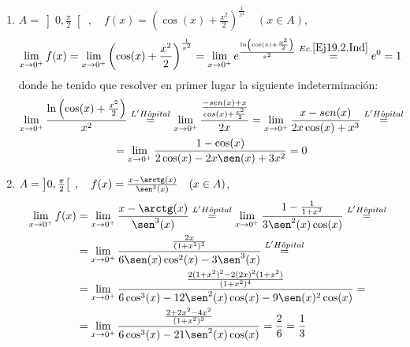 \begin{ejercicio}
\begin{enumerate}
        \item $A = \left] 0, \frac{\pi}{2}\right[\;,\quad f(x)=\left(\cos(x) + \frac{x^2}{2}\right)^{\frac{1}{x^2}}\quad (x\in A)$,
        \begin{equation*}
            \lim_{x\to 0^+}f(x)
            = \lim_{x\to 0^+} \left(\cos(x) + \frac{x^2}{2}\right)^{\frac{1}{x^2}}
            = \lim_{x\to 0^+} e^{\frac{\ln\left(\cos(x) + \frac{x^2}{2}\right)}{x^2}}
            \stackrel{Ec. \ref{Ej19.2.Ind}}{=} e^0 = 1
        \end{equation*}
        donde he tenido que resolver en primer lugar la siguiente indeterminación:
        \begin{multline}\label{Ej19.2.Ind}
            \lim_{x\to 0^+}\frac{\ln\left(\cos(x) + \frac{x^2}{2}\right)}{x^2}
            \stackrel{L'H\hat{o}pital}{=}
            \lim_{x\to 0^+} \frac{\frac{-sen(x)+x}{cos(x)+\frac{x^2}{2}}}{2x}
            = \lim_{x\to 0^+} \frac{x-sen(x)}{2x\cos(x)+x^3}
            \stackrel{L'H\hat{o}pital}{=}\\=
            \lim_{x\to 0^+} \frac{1-\cos(x)}{2\cos(x) -2x\sen(x) +3x^2} = 0
        \end{multline}

        \item $A = \left] 0, \frac{\pi}{2}\right[\;,\quad f(x)=\frac{x-\arctg(x)}{\sen^3(x)}\quad (x\in A)$,
        \begin{equation*}\begin{split}
            \lim_{x\to 0^+}f(x) &
            = \lim_{x\to 0^+} \frac{x-\arctg(x)}{\sen^3(x)}
            \stackrel{L'H\hat{o}pital}{=}
            \lim_{x\to 0^+} \frac{1-\frac{1}{1+x^2}}{3\sen^2(x)\cos(x)}
            \stackrel{L'H\hat{o}pital}{=} \\
            &= \lim_{x\to 0^+} \frac{\frac{2x}{(1+x^2)^2}}{6\sen(x)\cos^2(x)-3\sen^3(x)}
            \stackrel{L'H\hat{o}pital}{=}\\
            &= \lim_{x\to 0^+} \frac{\frac{2(1+x^2)^2 -2(2x)^2(1+x^2)}{(1+x^2)^4}}{6\cos^3(x) -12\sen^2(x)\cos(x) -9\sen(x)^2\cos(x)}=\\
            &= \lim_{x\to 0^+} \frac{\frac{2+2x^2 -4x^2}{(1+x^2)^3}}{6\cos^3(x) -21\sen^2(x)\cos(x)} = \frac{2}{6} = \frac{1}{3}
        \end{split}\end{equation*}


\end{enumerate}
\end{ejercicio}
